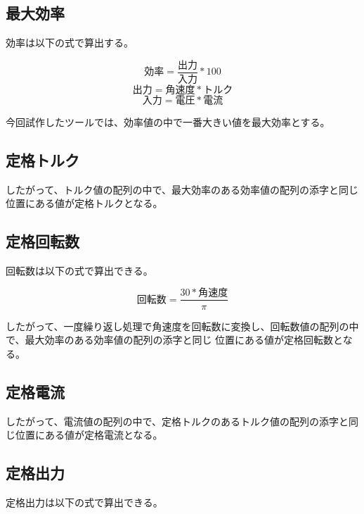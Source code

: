 
\subsection{最大効率}\label{sub:keisan_saidaikouritu}
効率は以下の式で算出する。

\[
    \mbox{効率} = \frac{\mbox{出力}}{\mbox{入力}}  * 100 
\]
\[
    \mbox{出力} = \mbox{角速度} * \mbox{トルク} 
\]
\[  
    \mbox{入力} = \mbox{電圧} * \mbox{電流} 
\]

今回試作したツールでは、効率値の中で一番大きい値を最大効率とする。



\subsection{定格トルク}\label{sub:keisan_teikakutoruku}
したがって、トルク値の配列の中で、最大効率のある効率値の配列の添字と同じ位置にある値が定格トルクとなる。



\subsection{定格回転数}\label{sub:keisan_teikakukaiten}
回転数は以下の式で算出できる。

\[
    \mbox{回転数} = \frac{30 * \mbox{角速度}}{\pi}   
\]

したがって、一度繰り返し処理で角速度を回転数に変換し、回転数値の配列の中で、最大効率のある効率値の配列の添字と同じ
位置にある値が定格回転数となる。


\subsection{定格電流}\label{sub:keisan_teikakuden}
したがって、電流値の配列の中で、定格トルクのあるトルク値の配列の添字と同じ位置にある値が定格電流となる。


\subsection{定格出力}\label{sub:keisan_teikakusyutu}
定格出力は以下の式で算出できる。

